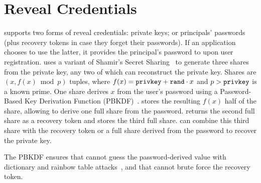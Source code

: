 %

\section{Reveal Credentials}
%
\sys supports two forms of reveal credentials: private keys; or
principals' passwords (plus recovery
tokens in case they forget their passwords).
%
If an application chooses to use the latter, it provides the principal's password
to \sys upon user registration.
%
\sys uses a variant of Shamir's Secret Sharing~\cite{secretsharing}
to generate three shares from the private key, any two of which can reconstruct the
private key.
%
Shares are $(x, f(x) \bmod p)$ tuples, where $f(x) = \texttt{{privkey}} + \texttt{{rand}} \cdot
x$ and $p > \texttt{{privkey}}$ is a known prime.
%
One share derives $x$ from the user's password using a Password-Based Key
Derivation Function (PBKDF)~\cite{pbkdf-rfc}.
%
\sys stores the resulting $f(x)$ half of the share, allowing \sys to derive one
full share from the password.
%
%
\sys returns the second full share as a recovery token and stores the third full
share.
%
\sys can combine this third share with the recovery token
or a full share derived from the password to recover the
private key.
%

The PBKDF ensures that \sys cannot guess the password-derived value with
dictionary and rainbow table attacks~\cite{pbkdf}, and that \sys cannot brute force
the recovery token.
%
%

%
%

